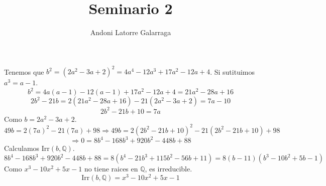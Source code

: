 \documentclass{article}
\title{Seminario 2}
\author{Andoni Latorre Galarraga}
\date{}
\newcommand{\bb}[1]{\mathbb{#1}}
\begin{document}
\maketitle

\noindent Tenemos que $b^2=(2a^2-3a+2)^2=4 a^4 - 12 a^3 + 17 a^2 - 12 a + 4$. Si sutituimos $a^3=a-1$.
$$
b^2 = 4 a(a-1) - 12 (a-1) + 17 a^2 - 12 a + 4 = 21 a^2 - 28 a + 16
$$
$$
2b^2-21b= 2 (21 a^2 - 28 a + 16) - 21 (2 a^2 - 3 a + 2) = 7 a - 10
$$
$$
2b^2 - 21b + 10 = 7 a
$$
Como $b = 2a^2 - 3a + 2$.
$$
49b = 2 (7a)^2 - 21 (7a) + 98 \Rightarrow
49b = 2 (2b^2 - 21b + 10)^2 - 21 (2b^2 - 21b + 10) + 98
$$
$$
\Rightarrow 0 = 8 b^4 - 168 b^3 + 920 b^2 - 448 b + 88
$$
Calculamos $\text{Irr} (b, \bb{Q})$.
$$
8 b^4 - 168 b^3 + 920 b^2 - 448 b + 88 = 8 (b^4 - 21 b^3 + 115 b^2 - 56 b + 11) = 8 (b - 11) (b^3 - 10 b^2 + 5 b - 1)
$$
Como $x^3 - 10 x^2 + 5 x - 1$ no tiene raices en $\bb{Q}$, es irreducible.
$$
\text{Irr} (b, \bb{Q}) = x^3 - 10 x^2 + 5 x - 1
$$
\end{document}
